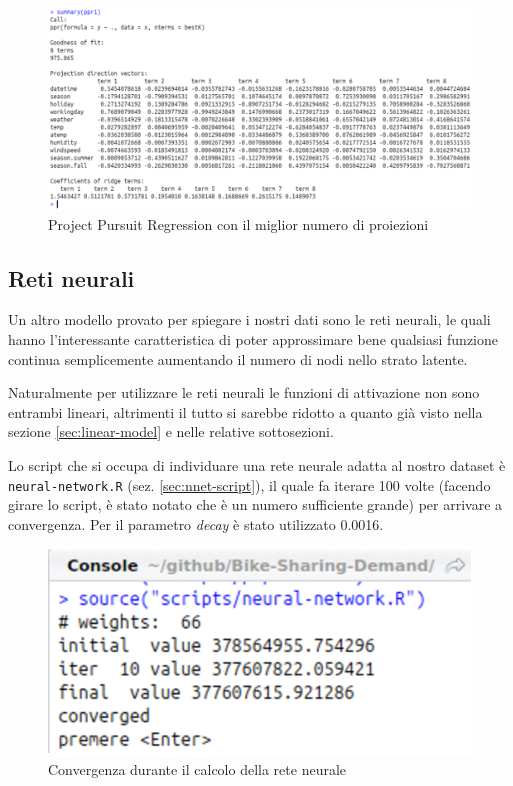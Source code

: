 \begin{figure}[H]
  \centering
  \includegraphics[width=.7\columnwidth]{images/non-linear/ppr-result.eps}
  \caption{Project Pursuit Regression con il miglior numero di proiezioni}
  \label{fig:ppr-result}
\end{figure}


\subsection{Reti neurali}\label{sec:neural-nets}
Un altro modello provato per spiegare i nostri dati sono le reti neurali, le
quali hanno l'interessante caratteristica di poter approssimare bene qualsiasi
funzione continua semplicemente aumentando il numero di nodi nello strato
latente.

Naturalmente per utilizzare le reti neurali le funzioni di attivazione non sono
entrambi lineari, altrimenti il tutto si sarebbe ridotto a quanto già visto
nella sezione \ref{sec:linear-model} e nelle relative sottosezioni.

Lo script che si occupa di individuare una rete neurale adatta al nostro
dataset è \texttt{neural-network.R} (sez. \ref{sec:nnet-script}), il quale
fa iterare 100 volte (facendo girare lo script, è stato notato che è un numero
sufficiente grande) per arrivare a convergenza. Per il parametro \emph{decay}
è stato utilizzato 0.0016.

\begin{figure}[H]
  \centering
  \includegraphics[width=.7\columnwidth]{images/non-linear/nnet-progress.eps}
  \caption{Convergenza durante il calcolo della rete neurale}
  \label{fig:nnet-progress}
\end{figure}

